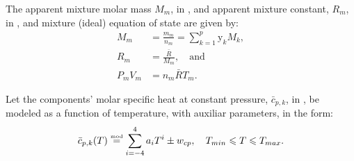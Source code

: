     The  apparent  mixture  molar  mass  $M_m$,  in  \kilogram\per\kilo\mole,  and  apparent   mixture   constant,   $R_m$,   in
    \kilo\joule\per\kilogram\usk\kelvin, and mixture (ideal) equation of state are given by:
    \begin{align}
        \label{eq:Mm}
        M_m         &= \frac{m_m}{n_m} = \sum_{k=1}^p \mathrm{y}_k M_k, \\
        \label{eq:Rm}
        R_m         &= \frac{\bar{R}}{M_m}, \quad\mbox{and} \\
        \label{eq:mEoS}
        P_mV_m      &= n_m\bar{R}T_m.
    \end{align}

    Let the components' molar specific heat at constant pressure, $\bar{c}_{p,k}$, in  \kilo\joule\per\kilo\mole\usk\kelvin,  be
    modeled as a function of temperature, with auxiliar parameters, in the form:
    \begin{equation}
        \bar{c}_{p,k}(T) \stackrel{\text{{\tiny mod}}}{=} \sum_{i=-4}^4 a_iT^i \pm w_{cp}, \quad T_{min} \leqslant T \leqslant T_{max}.
        \label{eq:cp}
    \end{equation}

